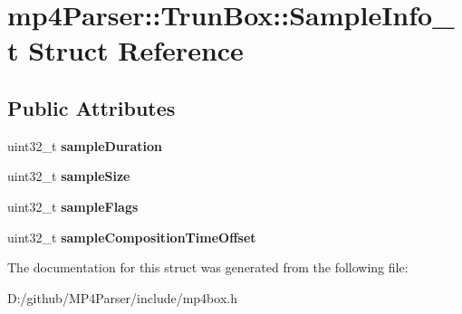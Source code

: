 \hypertarget{structmp4_parser_1_1_trun_box_1_1_sample_info__t}{}\section{mp4\+Parser\+::Trun\+Box\+::Sample\+Info\+\_\+t Struct Reference}
\label{structmp4_parser_1_1_trun_box_1_1_sample_info__t}
\subsection*{Public Attributes}
\begin{DoxyCompactItemize}
\item 
\mbox{\label{structmp4_parser_1_1_trun_box_1_1_sample_info__t_a2c0fa85a5e84d8345501a9a5e91af1d0}} 
uint32\+\_\+t {\bfseries sample\+Duration}
\item 
\mbox{\label{structmp4_parser_1_1_trun_box_1_1_sample_info__t_a3b4d287b73adab3877c30440e8dbd53e}} 
uint32\+\_\+t {\bfseries sample\+Size}
\item 
\mbox{\label{structmp4_parser_1_1_trun_box_1_1_sample_info__t_a624cf548d0faa786db2c6535957aa1a3}} 
uint32\+\_\+t {\bfseries sample\+Flags}
\item 
\mbox{\label{structmp4_parser_1_1_trun_box_1_1_sample_info__t_a398b327d8e5436c27e5edd698ca6652b}} 
uint32\+\_\+t {\bfseries sample\+Composition\+Time\+Offset}
\end{DoxyCompactItemize}


The documentation for this struct was generated from the following file\+:\begin{DoxyCompactItemize}
\item 
D\+:/github/\+M\+P4\+Parser/include/mp4box.\+h\end{DoxyCompactItemize}

